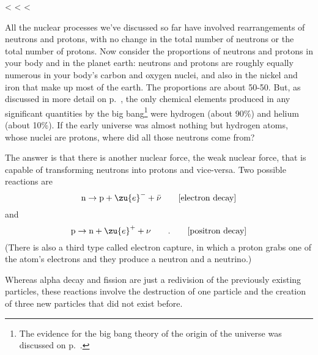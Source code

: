     <%
  <%
  <%

        All the nuclear processes we've discussed so far have
        involved rearrangements of neutrons and protons, with no
        change in the total number of neutrons or the total number
        of protons. Now consider the proportions of neutrons and
        protons in your body and in the planet earth: neutrons and
        protons are roughly equally numerous in your body's carbon
        and oxygen nuclei, and also in the nickel and iron that make
        up most of the earth. The proportions are about 50-50. But, as discussed in more
        detail on p.~\pageref{subsec:nucleosynthesis},
        the only chemical elements produced in any significant
        quantities by the big bang\footnote{The evidence for
        the big bang theory of the origin of the universe was discussed
        on p.~\pageref{bigbang}.} were hydrogen (about 90\%) and
        helium (about 10\%). If the early universe was almost
        nothing but hydrogen atoms, whose nuclei are protons, where
        did all those neutrons come from?

        The answer is that there is another nuclear force, the weak
        nuclear force, that is capable of transforming neutrons into
        protons and vice-versa. Two possible reactions are
        \begin{equation*}
                \text{n} \rightarrow \text{p} + \zu{e}^- +  \bar{\nu}\qquad        \hfill        \text{[electron decay]}
        \end{equation*}
        and
        \begin{equation*}
                \text{p} \rightarrow \text{n} + \zu{e}^+ + \nu  \qquad  .
                                                \qquad \hfill        \text{[positron decay]}        
        \end{equation*}
        (There is also a third type called electron capture, in
        which a proton grabs one of the atom's electrons and they
        produce a neutron and a neutrino.)\label{electroncapture}

        Whereas alpha decay and fission are just a redivision of the
        previously existing particles, these reactions involve the
        destruction of one particle and the creation of three new
        particles that did not exist before.

